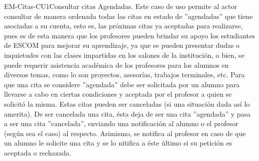 \begin{UseCase}{EM-Citas-CU1}{Consultar citas Agendadas.}
	{
	\noindent
	Este caso de uso permite al actor consultar de manera ordenada todas las citas en estado de ''agendadas'' que tiene asociadas a su cuenta, esto es, las próximas citas ya aceptadas para realizarse, pues es de esta manera que los profesores pueden brindar su apoyo los estudiantes de ESCOM para mejorar su aprendizaje, ya que se pueden presentar dudas o inquietudes con las clases impartidas en los salones de la institución, o bien, se puede requerir asistencia académica de los profesores para los alumnos en diversos temas, como lo son proyectos, asesorías, trabajos terminales, etc. 
	\newline
	Para que una cita se considere ''agendada'' debe ser solicitada por un alumno para llevarse a cabo en ciertas condiciones y aceptada por el profesor a quien se solicitó la misma. Estas citas pueden ser canceladas (si una situación dada así lo amerita). De ser cancelada una cita, ésta deja de ser una cita ''agendada'' y pasa a ser una cita ''cancelada'', enviando una notificación al alumno o el profesor (según sea el caso) al respecto. Asimismo, se notifica al profesor en caso de que un alumno le solicite una cita y se lo nitifica a éste último si su petición es aceptada o rechazada. 
	\newline
	}
\end{UseCase}

